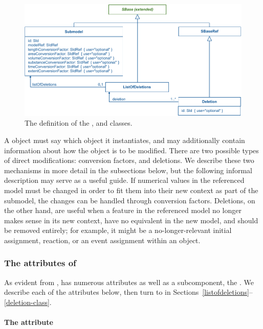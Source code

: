 \begin{figure}[hbt]
  \includegraphics{figs/submodel-uml}
  \caption{The definition of the \Submodel, \Deletion and
    \ListOfDeletions classes.}
  \label{submodel-uml}
\end{figure}

A \Submodel object must say which \Model object it instantiates, and may
additionally contain information about how the \Model object is to be
modified.  There are two possible types of direct modifications:
conversion factors, and deletions.  We describe these two mechanisms in
more detail in the subsections below, but the following informal
description may serve as a useful guide.  If numerical values in the
referenced model must be changed in order to fit them into their new
context as part of the submodel, the changes can be handled through
conversion factors.  Deletions, on the other hand, are useful when a
feature in the referenced model no longer makes sense in its new context, have no equivalent in the new model,
and should be removed entirely; for example, it might be a
no-longer-relevant initial assignment, reaction, or an event assignment
within an \Event object.


\subsubsection{The attributes of }

As evident from , \Submodel has numerous attributes as
well as a subcomponent, the .  We describe each
of the attributes below, then turn to  in
Sections~\ref{listofdeletions}--\ref{deletion-class}.


\paragraph{The \hspace*{1pt} attribute}

